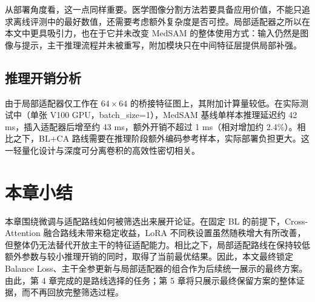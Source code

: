 从部署角度看，这一点同样重要。医学图像分割方法若要具备应用价值，不能只追求离线评测中的最好数值，还需要考虑额外复杂度是否可控。局部适配器之所以在本文中更具吸引力，也在于它并未改变 MedSAM 的整体使用方式：输入仍然是图像与提示，主干推理流程并未被重写，附加模块只在中间特征层提供局部补强。

\subsection{推理开销分析}

由于局部适配器仅工作在 $64\times64$ 的桥接特征图上，其附加计算量较低。在实际测试中（单张 V100 GPU，batch\_size=1），MedSAM 基线单样本推理延迟约 42 ms，插入适配器后增至约 43 ms，额外开销不超过 1 ms（相对增加约 2.4\%）。相比之下，BL+CA 路线需要在推理阶段额外编码参考样本，实际部署负担更大。这一轻量化设计与深度可分离卷积\cite{howard2017mobilenets}的高效性密切相关。

\section{本章小结}

本章围绕微调与适配路线如何被筛选出来展开论证。在固定 BL 的前提下，Cross-Attention 融合路线未带来稳定收益，LoRA 不同秩设置虽然随秩增大有所改善，但整体仍无法替代开放主干的特征适配能力。相比之下，局部适配路线在保持较低额外参数与较小推理开销的同时，取得了当前最优结果。因此，本文最终锁定 Balance Loss、主干全参更新与局部适配器的组合作为后续统一展示的最终方案。由此，第 4 章完成的是路线选择的任务；第 5 章将只展示最终保留方案的整体证据，而不再回放完整筛选过程。
